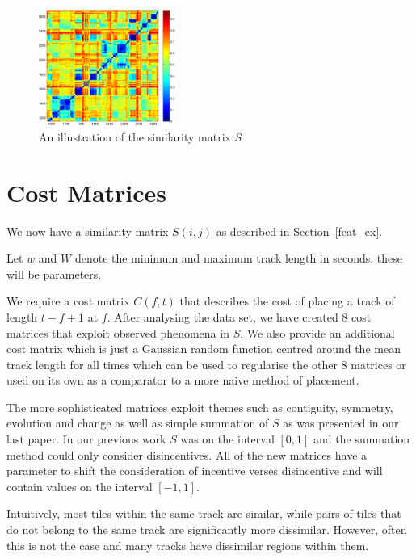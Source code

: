 \documentclass[twocolumn]{article}
\begin{document}
	\begin{figure}[t]
		\centering
		\includegraphics[width=0.4\textwidth]{images/simmat_plain}
		
		\caption{An illustration of the similarity matrix $S$}
		\label{fig:simmatrix}
	\end{figure} 
	
	\section{Cost Matrices}\label{costmatrix_sec} %
	
	We now have a similarity matrix $S(i,j)$ as described in Section~\ref{feat_ex}. 
	
	Let $w$ and $W$ denote the minimum and maximum track length in seconds, these will be parameters.
	
	We require a cost matrix $C(f,t)$ that describes the cost of placing a track of length $t-f+1$ at $f$. After analysing the data set, we have created $8$ cost matrices that exploit observed phenomena in $S$. We also provide an additional cost matrix which is just a Gaussian random function centred around the mean track length for all times which can be used to regularise the other $8$ matrices or used on its own as a comparator to a more naive method of placement. 
	
	The more sophisticated matrices exploit themes such as contiguity, symmetry, evolution and change as well as simple summation of $S$ as was presented in our last paper. In our previous work \cite{scarfe2013long} $S$ was on the interval $[0,1]$ and the summation method could only consider disincentives. All of the new matrices have a parameter to shift the consideration of incentive verses disincentive and will contain values on the interval $[-1,1]$.
	
	Intuitively, most tiles within the same track are similar, while pairs of tiles that do not belong to the same track are significantly more dissimilar. However, often this is not the case and many tracks have dissimilar regions within them. 
	
\end{document}
